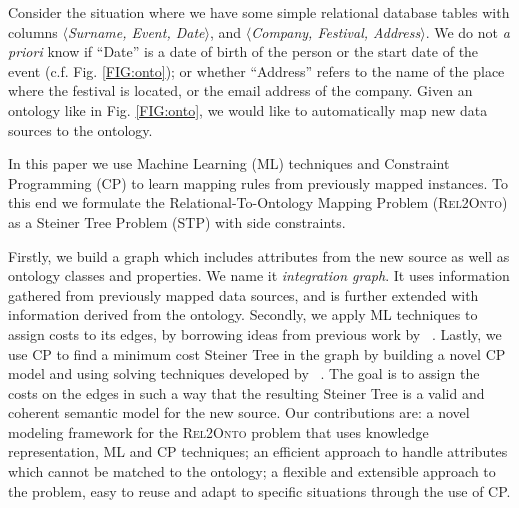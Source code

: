 \documentclass[letterpaper]{article} %
\newcommand{\authornote}[3]{
  {\fbox{\sc 
  #1}:$\blacktriangleright$\textcolor{#2}{\small{#3}}$\blacktriangleleft$}%
}
\newcommand{\npr}[1]{\authornote{NPR}{orange}{#1}}
\newcommand{\relonto}{\textsc{Rel2Onto}}
\newcommand{\forijcai}[1]{}
\newcommand{\citeasnoun}[1]{\citeauthor{#1}~\shortcite{#1}}
\begin{document}
Consider the situation where we have some simple relational database tables with columns $\langle$\textit{Surname, Event, Date}$\rangle$, and 
$\langle$\textit{Company, Festival, Address}$\rangle$.
We do not \textit{a priori} know if ``Date'' is a 
date of birth of the person or the start date of the event (c.f. Fig. \ref{FIG:onto}); or whether 
``Address'' refers to the name of the place where the festival is located, or the 
email address of the company. 
Given an ontology like in Fig. \ref{FIG:onto}, we would like to automatically map new data sources to  the 
ontology.\forijcai{\hfill$\square$}

In this paper we use Machine Learning (ML) techniques and Constraint Programming (CP) to learn mapping rules from previously mapped instances.
To this end we formulate the Relational-To-Ontology Mapping Problem (\relonto{}) as a Steiner Tree Problem (STP) with side constraints.

Firstly, we build a graph which includes attributes
from the new
source as well as ontology classes and properties.
We name it \emph{integration graph}.
It uses information gathered from previously mapped data sources, and is further extended with information derived from the ontology.
Secondly, we apply ML techniques to assign costs to its edges, by borrowing ideas from previous work by \citeasnoun{taheriyan2016learning}. 
Lastly, we use CP to find a minimum cost Steiner Tree in the graph by building a novel CP model and using solving techniques developed by \citeasnoun{deuna2016steiner}.
The goal is to assign the costs on the edges in such a way that the resulting 
Steiner Tree is a valid and coherent semantic model for the new source. 
Our contributions are:
	a novel modeling framework for the \relonto{} problem that uses knowledge representation, ML and CP techniques;
	an efficient approach to handle attributes which cannot be matched to 
	the ontology; \forijcai{through a new semantic labeling model and a new STP 
	model with additional nodes in the integration graph.}
	a flexible and extensible approach to the problem, easy to 
	reuse and adapt to specific situations through the use of CP.\forijcai{ allows introduction of additional constraints with no changes to the solver.} 
\end{document}
